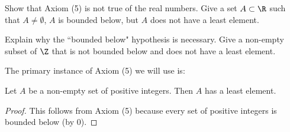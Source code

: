 \documentclass[oneside,12pt]{amsart}
\begin{document}
\begin{homework}
Show that Axiom (5) is not true of the real numbers. Give a set $A\subset\R$ such that $A\not=\emptyset$,
$A$ is bounded below, but $A$ does not have a least element.
\end{homework}

\begin{homework}
Explain why the ``bounded below" hypothesis is necessary. Give a non-empty subset of $\Z$ that is not bounded
below and does not have a least element.
\end{homework}

The primary instance of Axiom (5) we will use is:

\begin{remark}
Let $A$ be a non-empty set of positive integers. Then $A$ has a least element.
\end{remark}
\begin{proof}
This follows from Axiom (5) because every set of positive integers is bounded below (by 0).
\end{proof}




\end{document}
